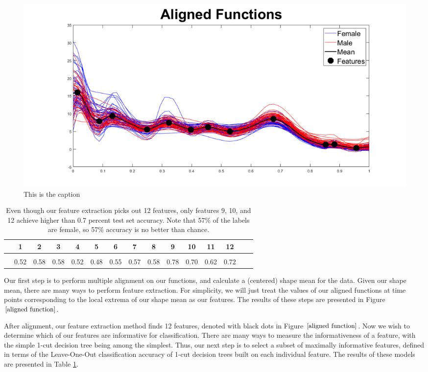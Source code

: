 \documentclass[]{article}
\begin{document}
\begin{center}
	\begin{figure}
		\includegraphics[width = \linewidth]{./Aligned Functions.png}
		\caption{This is the caption}
		\label{aligned function}
	\end{figure}
\end{center}
\begin{table}
	\begin{tabular}{|c|c|c|c|c|c|c|c|c|c|c|c|c|c|c|}
		\hline
		\text{Feature:}& 1 & 2 & 3 & 4 & 5 & 6 & 7 & 8 & 9 & 10 & 11 & 12\\
		\hline
		\text{1-cut Tree }&  &  &  &  &  &  &  &  &  &  &  & \\ 
		\text{LOO Accuracy:}& 0.52 & 0.58 & 0.58 & 0.52 & 0.48 & 0.55 & 0.57 & 0.58 & 0.78 & 0.70 & 0.62 & 0.72\\ 
		\hline
	\end{tabular}
	\caption{Even though our feature extraction picks out 12 features, only features 9, 10, and 12 achieve higher than 0.7 percent test set accuracy. Note that 57\% of the labels are female, so 57\% accuracy is no better than chance.}
	\label{feature_LOO}
\end{table}


Our first step is to perform multiple alignment on our functions, and calculate a (centered) shape mean for the data. Given our shape mean, there are many ways to perform feature extraction. For simplicity, we will just treat the values of our aligned functions at time points corresponding to the local extrema of our shape mean as our features. The results of these steps are presented in Figure $\ref{aligned function}$. 

After alignment, our feature extraction method finds 12 features, denoted with black dots in Figure $\ref{aligned function}$. Now we wish to determine which of our features are informative for classification. There are many ways to measure the informativeness of a feature, with the simple 1-cut decision tree being among the simplest. Thus, our next step is to select a subset of maximally informative features, defined in terms of the Leave-One-Out classification accuracy of 1-cut decision trees built on each individual feature. The results of these models are presented in Table \ref{feature_LOO}.
\end{document}
